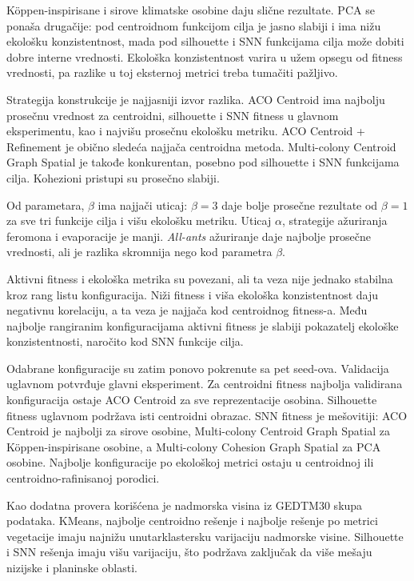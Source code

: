 \documentclass[11pt]{article}
\begin{document}
Köppen-inspirisane i sirove klimatske osobine daju slične rezultate. PCA se ponaša drugačije: pod centroidnom funkcijom cilja je jasno slabiji i ima nižu ekološku konzistentnost, mada pod silhouette i SNN funkcijama cilja može dobiti dobre interne vrednosti. Ekološka konzistentnost varira u užem opsegu od fitness vrednosti, pa razlike u toj eksternoj metrici treba tumačiti pažljivo.

Strategija konstrukcije je najjasniji izvor razlika. ACO Centroid ima najbolju prosečnu vrednost za centroidni, silhouette i SNN fitness u glavnom eksperimentu, kao i najvišu prosečnu ekološku metriku. ACO Centroid + Refinement je obično sledeća najjača centroidna metoda. Multi-colony Centroid Graph Spatial je takođe konkurentan, posebno pod silhouette i SNN funkcijama cilja. Kohezioni pristupi su prosečno slabiji.

Od parametara, $\beta$ ima najjači uticaj: $\beta=3$ daje bolje prosečne rezultate od $\beta=1$ za sve tri funkcije cilja i višu ekološku metriku. Uticaj $\alpha$, strategije ažuriranja feromona i evaporacije je manji. \textit{All-ants} ažuriranje daje najbolje prosečne vrednosti, ali je razlika skromnija nego kod parametra $\beta$.

Aktivni fitness i ekološka metrika su povezani, ali ta veza nije jednako stabilna kroz rang listu konfiguracija. Niži fitness i viša ekološka konzistentnost daju negativnu korelaciju, a ta veza je najjača kod centroidnog fitness-a. Među najbolje rangiranim konfiguracijama aktivni fitness je slabiji pokazatelj ekološke konzistentnosti, naročito kod SNN funkcije cilja.

Odabrane konfiguracije su zatim ponovo pokrenute sa pet seed-ova. Validacija uglavnom potvrđuje glavni eksperiment. Za centroidni fitness najbolja validirana konfiguracija ostaje ACO Centroid za sve reprezentacije osobina. Silhouette fitness uglavnom podržava isti centroidni obrazac. SNN fitness je mešovitiji: ACO Centroid je najbolji za sirove osobine, Multi-colony Centroid Graph Spatial za Köppen-inspirisane osobine, a Multi-colony Cohesion Graph Spatial za PCA osobine. Najbolje konfiguracije po ekološkoj metrici ostaju u centroidnoj ili centroidno-rafinisanoj porodici.

Kao dodatna provera korišćena je nadmorska visina iz GEDTM30 skupa podataka. KMeans, najbolje centroidno rešenje i najbolje rešenje po metrici vegetacije imaju najnižu unutarklastersku varijaciju nadmorske visine. Silhouette i SNN rešenja imaju višu varijaciju, što podržava zaključak da više mešaju nizijske i planinske oblasti.
\end{document}
